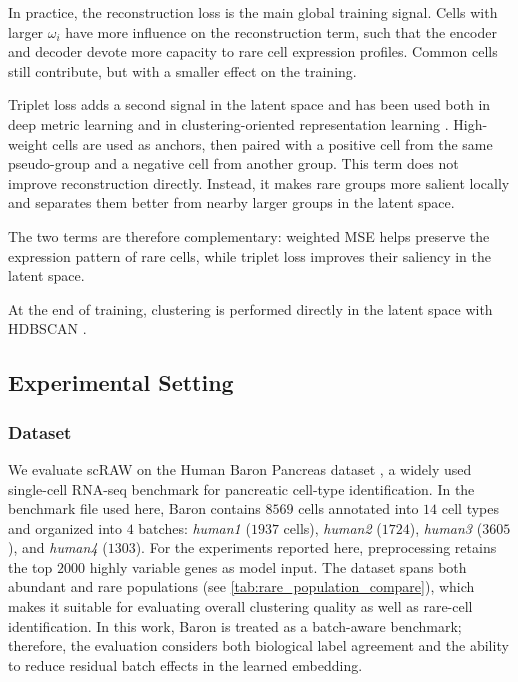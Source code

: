 \documentclass[11pt,a4paper]{article}
\begin{document}
In practice, the reconstruction loss is the main global training signal. Cells
with larger $\omega_i$ have more influence on the reconstruction term,
such that the encoder and decoder devote more capacity to rare cell expression
profiles. Common cells still contribute, but with a smaller effect on
the training.

Triplet loss adds a second signal in the latent space and has been used
both in deep metric learning and in clustering-oriented representation
learning \cite{schroff2015,yang2016}. High-weight
cells are used as anchors, then paired with a positive cell from the
same pseudo-group and a negative cell from another group. This term
does not improve reconstruction directly. Instead, it makes rare groups
more salient locally and separates them better from nearby larger
groups in the latent space.

The two terms are therefore complementary: weighted MSE helps preserve
the expression pattern of rare cells, while triplet loss improves their
saliency in the latent space.

At the end of training, clustering is performed directly in the latent space with HDBSCAN \cite{mcinnes2017}.

\subsection{Experimental Setting}



\subsubsection*{Dataset}

We evaluate scRAW on the Human Baron Pancreas dataset \cite{baron2016}, a widely used single-cell RNA-seq benchmark for pancreatic cell-type identification. In the benchmark file used here, Baron contains $8569$ cells annotated into $14$ cell types and organized into $4$ batches: \textit{human1} ($1937$ cells), \textit{human2} ($1724$), \textit{human3} ($3605$), and \textit{human4} ($1303$). For the experiments reported here, preprocessing retains the top $2000$ highly variable genes as model input. The dataset spans both abundant and rare populations (see \autoref{tab:rare_population_compare}), which makes it suitable for evaluating overall clustering quality as well as rare-cell identification. In this work, Baron is treated as a batch-aware benchmark; therefore, the evaluation considers both biological label agreement and the ability to reduce residual batch effects in the learned embedding. 
\end{document}
